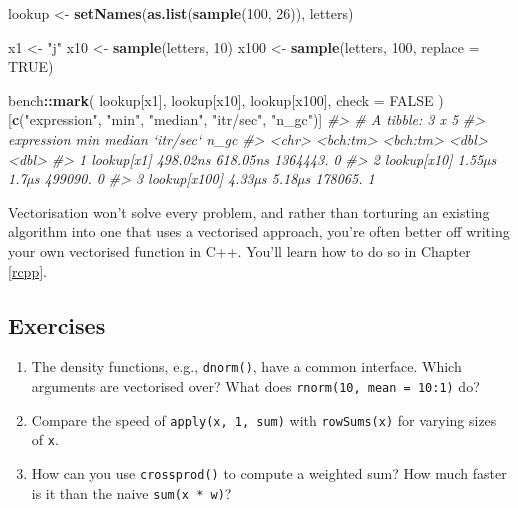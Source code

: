 \documentclass[]{book}
\newenvironment{Shaded}{\begin{snugshade}}{\end{snugshade}}
\newcommand{\CommentTok}[1]{\textcolor[rgb]{0.37,0.37,0.37}{\textit{#1}}}
\newcommand{\DataTypeTok}[1]{\textcolor[rgb]{0.27,0.27,0.27}{#1}}
\newcommand{\DecValTok}[1]{\textcolor[rgb]{0.06,0.06,0.06}{#1}}
\newcommand{\KeywordTok}[1]{\textcolor[rgb]{0.27,0.27,0.27}{\textbf{#1}}}
\newcommand{\NormalTok}[1]{#1}
\newcommand{\OperatorTok}[1]{\textcolor[rgb]{0.43,0.43,0.43}{\textbf{#1}}}
\newcommand{\OtherTok}[1]{\textcolor[rgb]{0.37,0.37,0.37}{#1}}
\newcommand{\StringTok}[1]{\textcolor[rgb]{0.5,0.5,0.5}{#1}}
\begin{document}
\begin{Shaded}
\begin{Highlighting}[]
\NormalTok{lookup <-}\StringTok{ }\KeywordTok{setNames}\NormalTok{(}\KeywordTok{as.list}\NormalTok{(}\KeywordTok{sample}\NormalTok{(}\DecValTok{100}\NormalTok{, }\DecValTok{26}\NormalTok{)), letters)}

\NormalTok{x1 <-}\StringTok{ "j"}
\NormalTok{x10 <-}\StringTok{ }\KeywordTok{sample}\NormalTok{(letters, }\DecValTok{10}\NormalTok{)}
\NormalTok{x100 <-}\StringTok{ }\KeywordTok{sample}\NormalTok{(letters, }\DecValTok{100}\NormalTok{, }\DataTypeTok{replace =} \OtherTok{TRUE}\NormalTok{)}

\NormalTok{bench}\OperatorTok{::}\KeywordTok{mark}\NormalTok{(}
\NormalTok{  lookup[x1],}
\NormalTok{  lookup[x10],}
\NormalTok{  lookup[x100],}
  \DataTypeTok{check =} \OtherTok{FALSE}
\NormalTok{)[}\KeywordTok{c}\NormalTok{(}\StringTok{"expression"}\NormalTok{, }\StringTok{"min"}\NormalTok{, }\StringTok{"median"}\NormalTok{, }\StringTok{"itr/sec"}\NormalTok{, }\StringTok{"n_gc"}\NormalTok{)]}
\CommentTok{#> # A tibble: 3 x 5}
\CommentTok{#>   expression        min   median `itr/sec`  n_gc}
\CommentTok{#>   <chr>        <bch:tm> <bch:tm>     <dbl> <dbl>}
\CommentTok{#> 1 lookup[x1]   498.02ns 618.05ns  1364443.     0}
\CommentTok{#> 2 lookup[x10]    1.55µs    1.7µs   499090.     0}
\CommentTok{#> 3 lookup[x100]   4.33µs   5.18µs   178065.     1}
\end{Highlighting}
\end{Shaded}

Vectorisation won't solve every problem, and rather than torturing an existing algorithm into one that uses a vectorised approach, you're often better off writing your own vectorised function in C++. You'll learn how to do so in Chapter \ref{rcpp}.

\hypertarget{exercises-20}{%
\subsection{Exercises}\label{exercises-20}}

\begin{enumerate}
\def\labelenumi{\arabic{enumi}.}
\item
  The density functions, e.g., \texttt{dnorm()}, have a common interface. Which
  arguments are vectorised over? What does \texttt{rnorm(10,\ mean\ =\ 10:1)} do?
\item
  Compare the speed of \texttt{apply(x,\ 1,\ sum)} with \texttt{rowSums(x)} for varying sizes
  of \texttt{x}.
\item
  How can you use \texttt{crossprod()} to compute a weighted sum? How much faster is
  it than the naive \texttt{sum(x\ *\ w)}?
\end{enumerate}
\end{document}
